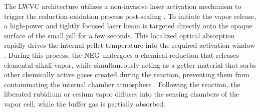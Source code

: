 The LWVC architecture utilizes a non-invasive laser activation
mechanism to trigger the reduction-oxidation process post-sealing \cite{lucivero2022}.
To initiate the vapor release, a high-power and tightly focused laser beam
is targeted directly onto the opaque surface of the
small pill for a few seconds. This localized
optical absorption rapidly drives the internal pellet temperature into the
required activation window  \cite{lucivero2022}. During this process,
the NEG undergoes a
chemical reduction that releases elemental alkali vapor, while simultaneously
acting as a getter material that sorbs other
chemically active gases created during the reaction, preventing them from
contaminating the internal chamber atmosphere \cite{scherer2012}.
Following the reaction, the liberated rubidium or cesium vapor
diffuses into the sensing chambers of the vapor cell, while the buffer gas 
is partially absorbed. 


